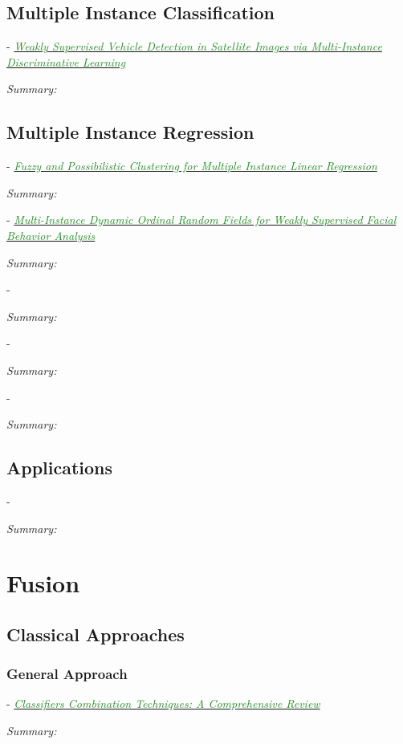 \documentclass[]{article}
\newcommand{\paperentry}[4]{
            \hangindent=1cm
            \cite{#1} - \href{run:../References/#3}{\textcolor{ForestGreen}{\textit{#2}}}
            
            \noindent            
            \begin{minipage}[t]{0.1\linewidth}\hfill\end{minipage}
            \begin{minipage}[t]{0.8\linewidth}\textcolor{NavyBlue}{{\textit{Summary:}}}#4\end{minipage}
            \vspace{.25cm}
          }
\begin{document}
		
		
		
	
	\subsection{Multiple Instance Classification}
	
		\paperentry{Cao2016VehicleDetectionMIL}
		{Weakly Supervised Vehicle Detection in Satellite Images via Multi-Instance Discriminative Learning}
		{Multiple_Instance_Learning/Cao2016VehicleDetectionMIL.pdf}
		{}
		
	
	\subsection{Multiple Instance Regression}
	
		\paperentry{Trabelsi2018FuzzyClusteringMILRegression}
		{Fuzzy and Possibilistic Clustering for Multiple Instance Linear Regression}
		{Multiple_Instance_Learning/Trabelsi2018FuzzyClusteringMILRegression.pdf}
		{}
		
		\paperentry{Ruiz2018MIDynamicOrdinalRegression}
		{Multi-Instance Dynamic Ordinal Random Fields for Weakly Supervised Facial Behavior Analysis}
		{Multiple_Instance_Learning/Ruiz2018MIDynamicOrdinalRegression.pdf}
		{}
		
		\paperentry{}
		{}
		{Multiple_Instance_Learning/}
		{}
		
		\paperentry{}
		{}
		{Multiple_Instance_Learning/}
		{}
		
		\paperentry{}
		{}
		{Multiple_Instance_Learning/}
		{}


	\subsection{Applications}
	
		\paperentry{}
		{}
		{}
		{}
		


\section{Fusion}
	
	\subsection{Classical Approaches}
		\subsubsection{General Approach}
			\paperentry{Mohandes2018ClassifierCombinationTechniquesReview}
			{Classifiers Combination Techniques: A Comprehensive Review}
			{Fusion/Reviews/Mohandes2018ClassifierCombinationTechniquesReview.pdf}
			{}
			
\end{document}
